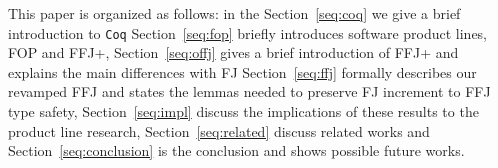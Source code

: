 This paper is organized as follows: in the Section~\ref{seq:coq} we give a brief introduction to \texttt{Coq} 
Section~\ref{seq:fop} briefly introduces software product lines, \gls{FOP} and \gls{FFJ+},
Section~\ref{seq:offj} gives a brief introduction of  \gls{FFJ+} and explains the main differences with \gls{FJ}
Section~\ref{seq:ffj} formally describes our revamped \gls{FFJ} and states the lemmas needed to preserve \gls{FJ} increment to \gls{FFJ} type safety, 
Section~\ref{seq:impl} discuss the implications of these results to the product line research,
Section~\ref{seq:related} discuss related works and
Section~\ref{seq:conclusion} is the conclusion and shows possible future works.
